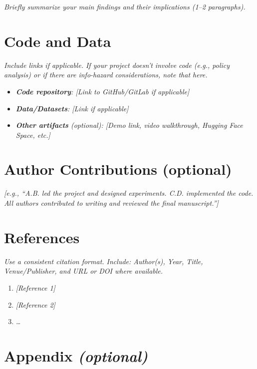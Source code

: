 \documentclass[11pt]{article}
\begin{document}
\textit{Briefly summarize your main findings and their implications (1--2 paragraphs).}

\section*{Code and Data}

\textit{Include links if applicable. If your project doesn't involve code (e.g., policy
analysis) or if there are info-hazard considerations, note that here.}

\begin{itemize}[label=--]
  \item \textit{\textbf{Code repository}: [Link to GitHub/GitLab if applicable]}
  \item \textit{\textbf{Data/Datasets}: [Link if applicable]}
  \item \textit{\textbf{Other artifacts} (optional): [Demo link, video walkthrough, Hugging Face
  Space, etc.]}
\end{itemize}

\section*{Author Contributions (optional)}

\textit{[e.g., ``A.B. led the project and designed experiments. C.D. implemented the code. All
authors contributed to writing and reviewed the final manuscript.'']}

\section*{References}

\textit{Use a consistent citation format. Include: Author(s), Year, Title, Venue/Publisher, and
URL or DOI where available.}

\begin{enumerate}
  \item \textit{[Reference 1]}
  \item \textit{[Reference 2]}
  \item \textit{\ldots}
\end{enumerate}

\section*{Appendix \textit{(optional)}}
\end{document}
